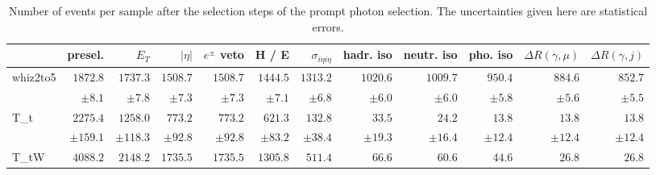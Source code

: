 \begin{landscape}
\begin{table}
\caption{Number of events per sample after the selection steps of the prompt photon selection. The uncertainties given here are statistical errors.}
\begin{tabular}{l | r r r r r r r r r r r }

                  &           presel. &           $E_{T}$ &          $|\eta|$ &      $e^\pm$ veto &             H / E & $\sigma_{i\eta i\eta}$ &         hadr. iso &        neutr. iso &          pho. iso & $\Delta R(\gamma, \mu)$ & $\Delta R(\gamma, j)$ \\

\hline

\hline

         whiz2to5 &$            1872.8 $&$            1737.3 $&$            1508.7 $&$            1508.7 $&$            1444.5 $&$            1313.2 $&$            1020.6 $&$            1009.7 $&$             950.4 $&$             884.6 $&$             852.7 $ \\

                  &$ \pm              8.1 $&$ \pm              7.8 $&$ \pm              7.3 $&$ \pm              7.3 $&$ \pm              7.1 $&$ \pm              6.8 $&$ \pm              6.0 $&$ \pm              6.0 $&$ \pm              5.8 $&$ \pm              5.6 $&$ \pm              5.5 $ \\

             T\_t &$            2275.4 $&$            1258.0 $&$             773.2 $&$             773.2 $&$             621.3 $&$             132.8 $&$              33.5 $&$              24.2 $&$              13.8 $&$              13.8 $&$              13.8 $ \\

                  &$ \pm            159.1 $&$ \pm            118.3 $&$ \pm             92.8 $&$ \pm             92.8 $&$ \pm             83.2 $&$ \pm             38.4 $&$ \pm             19.3 $&$ \pm             16.4 $&$ \pm             12.4 $&$ \pm             12.4 $&$ \pm             12.4 $ \\

            T\_tW &$            4088.2 $&$            2148.2 $&$            1735.5 $&$            1735.5 $&$            1305.8 $&$             511.4 $&$              66.6 $&$              60.6 $&$              44.6 $&$              26.8 $&$              26.8 $ \\


\end{tabular}
\end{table}
\end{landscape}
